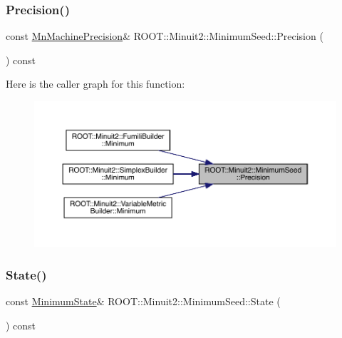 \mbox{\label{classROOT_1_1Minuit2_1_1MinimumSeed_a0cc83616e61f2d3552cedf34ed09e361}} 
\subsubsection{\texorpdfstring{Precision()}{Precision()}\hspace{0.1cm}{\footnotesize\ttfamily [3/3]}}
{\footnotesize\ttfamily const \mbox{\hyperlink{classROOT_1_1Minuit2_1_1MnMachinePrecision}{Mn\+Machine\+Precision}}\& R\+O\+O\+T\+::\+Minuit2\+::\+Minimum\+Seed\+::\+Precision (\begin{DoxyParamCaption}{ }\end{DoxyParamCaption}) const\hspace{0.3cm}{\ttfamily [inline]}}

Here is the caller graph for this function\+:
\nopagebreak
\begin{figure}[H]
\begin{center}
\leavevmode
\includegraphics[width=350pt]{d1/d50/classROOT_1_1Minuit2_1_1MinimumSeed_a0cc83616e61f2d3552cedf34ed09e361_icgraph}
\end{center}
\end{figure}
\mbox{\label{classROOT_1_1Minuit2_1_1MinimumSeed_a732476aa579a27366511684213835a2e}} 
\subsubsection{\texorpdfstring{State()}{State()}\hspace{0.1cm}{\footnotesize\ttfamily [1/3]}}
{\footnotesize\ttfamily const \mbox{\hyperlink{classROOT_1_1Minuit2_1_1MinimumState}{Minimum\+State}}\& R\+O\+O\+T\+::\+Minuit2\+::\+Minimum\+Seed\+::\+State (\begin{DoxyParamCaption}{ }\end{DoxyParamCaption}) const\hspace{0.3cm}{\ttfamily [inline]}}

